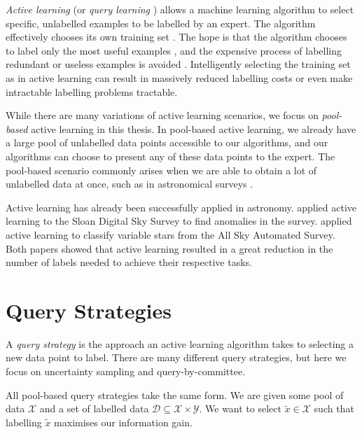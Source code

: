     \emph{Active learning} (or \emph{query learning} \citep{settles09, seung92,
    angluin86}) allows a machine learning algorithm to select specific,
    unlabelled examples to be labelled by an expert. The algorithm effectively
    chooses its own training set \citep{settles09}. The hope is that the
    algorithm chooses to label only the most useful examples
    \citep{mccallum98}, and the expensive process of labelling redundant or
    useless examples is avoided \citep{engelson99}. Intelligently selecting the
    training set as in active learning can result in massively reduced labelling
    costs \citep{lewis94, king04} or even make intractable labelling problems
    tractable.

    While there are many variations of active learning scenarios, we focus on
    \emph{pool-based} active learning in this thesis. In pool-based active
    learning, we already have a large pool of unlabelled data points accessible
    to our algorithms, and our algorithms can choose to present any of these
    data points to the expert. The pool-based scenario commonly arises when we
    are able to obtain a lot of unlabelled data at once, such as in astronomical
    surveys \citep{pelleg04, richards12, marshall15}.

    Active learning has already been successfully applied in astronomy.
    \citet{pelleg04} applied active learning to the Sloan Digital Sky Survey to
    find anomalies in the survey. \citet{richards12} applied active learning to
    classify variable stars from the All Sky Automated Survey. Both papers
    showed that active learning resulted in a great reduction in the number of
    labels needed to achieve their respective tasks.

\section{Query Strategies}
\label{sec:query-strategies}

    A \emph{query strategy} is the approach an active learning algorithm takes
    to selecting a new data point to label. There are many different query
    strategies, but here we focus on uncertainty sampling and
    query-by-committee.

    All pool-based query strategies take the same form. We are given some pool
    of data $\mathcal X$ and a set of labelled data $\mathcal D \subseteq
    \mathcal X \times \mathcal Y$. We want to select $\tilde x \in \mathcal X$
    such that labelling $\tilde x$ maximises our information gain.

